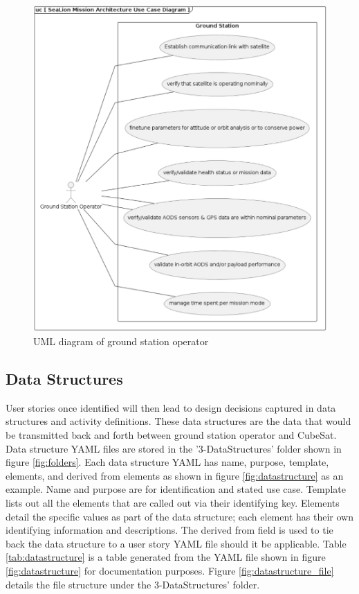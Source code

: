 \documentclass[journal,article,submit,pdftex,moreauthors]{Definitions/mdpi}
\begin{document}
\begin{figure}[H]
    \includegraphics[width=13.75 cm]{assets/uml_userstory2.png}
    \caption{UML diagram of ground station operator}
	\label{fig:uml_userstory2}
    \end{figure}   
\unskip

\subsection{Data Structures}
User stories once identified will then lead to design decisions captured in data structures and activity definitions.  These data structures are the data that would be transmitted back and forth between ground station operator and CubeSat.  Data structure YAML files are stored in the '3-DataStructures' folder shown in figure \ref{fig:folders}.  Each data structure YAML has name, purpose, template, elements, and derived from elements as shown in figure \ref{fig:datastructure} as an example.  Name and purpose are for identification and stated use case.  Template lists out all the elements that are called out via their identifying key.  Elements detail the specific values as part of the data structure; each element has their own identifying information and descriptions.  The derived from field is used to tie back the data structure to a user story YAML file should it be applicable.  Table \ref{tab:datastructure} is a table generated from the YAML file shown in figure \ref{fig:datastructure} for documentation purposes.  Figure \ref{fig:datastructure_file} details the file structure under the 3-DataStructures' folder.
\end{document}
